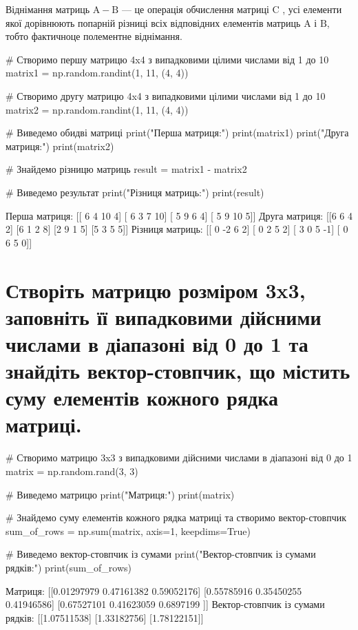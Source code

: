 \documentclass[]{article}
\newcounter{pythoncode}
\begin{document}
Віднімання матриць \(\mathrm A - \mathrm B\) --- це операція обчислення
матриці \(\mathrm C\) , усі елементи якої дорівнюють попарній різниці
всіх відповідних елементів матриць \(\mathrm A\) і \(\mathrm B\), тобто
фактичноце полементне віднімання.

\begin{pythoncode}
    # Створимо першу матрицю 4x4 з випадковими цілими числами від 1 до 10
    matrix1 = np.random.randint(1, 11, (4, 4))

    # Створимо другу матрицю 4x4 з випадковими цілими числами від 1 до 10
    matrix2 = np.random.randint(1, 11, (4, 4))

    # Виведемо обидві матриці
    print("Перша матриця:")
    print(matrix1)
    print("Друга матриця:")
    print(matrix2)

    # Знайдемо різницю матриць
    result = matrix1 - matrix2

    # Виведемо результат
    print("Різниця матриць:")
    print(result)
\end{pythoncode}

\begin{out}
	Перша матриця:
	[[ 6  4 10  4]
	 [ 6  3  7 10]
	 [ 5  9  6  4]
	 [ 5  9 10  5]]
	Друга матриця:
	[[6 6 4 2]
	 [6 1 2 8]
	 [2 9 1 5]
	 [5 3 5 5]]
	Різниця матриць:
	[[ 0 -2  6  2]
	 [ 0  2  5  2]
	 [ 3  0  5 -1]
	 [ 0  6  5  0]]
\end{out}

\section{Створіть матрицю розміром 3x3, заповніть її випадковими дійсними числами в діапазоні від 0 до 1 та знайдіть вектор-стовпчик, що містить суму елементів кожного рядка матриці.}

\begin{pythoncode}
    # Створимо матрицю 3x3 з випадковими дійсними числами в діапазоні від 0 до 1
    matrix = np.random.rand(3, 3)

    # Виведемо матрицю
    print("Матриця:")
    print(matrix)

    # Знайдемо суму елементів кожного рядка матриці та створимо вектор-стовпчик
    sum_of_rows = np.sum(matrix, axis=1, keepdims=True)

    # Виведемо вектор-стовпчик із сумами
    print("Вектор-стовпчик із сумами рядків:")
    print(sum_of_rows)
\end{pythoncode}

\begin{out}
	Матриця:
	[[0.01297979 0.47161382 0.59052176]
	 [0.55785916 0.35450255 0.41946586]
	 [0.67527101 0.41623059 0.6897199 ]]
	Вектор-стовпчик із сумами рядків:
	[[1.07511538]
	 [1.33182756]
	 [1.78122151]]
\end{out}
\end{document}
